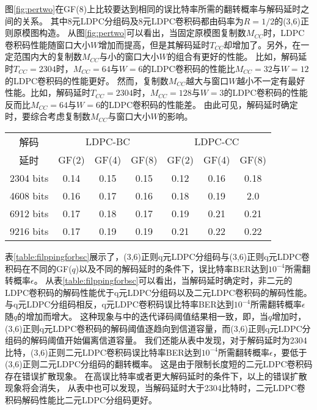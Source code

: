 图\ref{fig:pertwo}在GF($8$)上比较要达到相同的误比特率所需的翻转概率与解码延时之间的关系。
其中8元LDPC分组码及8元LDPC卷积码都由码率为$R=1/2$的(3,6)正则原模图构造。
从图\ref{fig:pertwo}可以看出，当固定原模图复制数$M_{CC}$时，LDPC卷积码性能随窗口大小$W$增加而提高，但是其解码延时$T_{CC}$却增加了。另外，在一定范围内大的复制数$M_{CC}$与小的窗口大小$W$的组合有更好的性能。
比如，解码延时$T_{CC}=2304$时，$M_{CC}=64$与$W=6$的LDPC卷积码的性能比$M_{CC}=32$与$W=12$的LDPC卷积码的性能更好。
然而，复制数$M_{CC}$越大与窗口$W$越小不一定有最好性能。比如，解码延时$T_{CC}=2304$时，$M_{CC}=128$与$W=3$的LDPC卷积码的性能反而比$M_{CC}=64$与$W=6$的LDPC卷积码的性能差。
由此可见，解码延时确定时，要综合考虑复制数$M_{CC}$与窗口大小$W$的影响。
\begin{center}
\label{table:filppingforbsc}
\begin{tabular}{|c|c|c|c|c|c|c|}
 \hline
解码 & \multicolumn{3}{|c|}{LDPC-BC} & \multicolumn{3}{|c|}{LDPC-CC} \\ \cline{2-7}
延时 & GF(2) & GF(4) & GF(8) & GF(2) & GF(4) & GF(8) \\ \hline
2304 bits & 0.14 & 0.15 & 0.15 & 0.12 & 0.16 & 0.18\\ \hline
4608 bits & 0.16 & 0.17 & 0.16 & 0.18 & 0.19 & 2.0\\ \hline
6912 bits & 0.17 & 0.18 & 0.17 & 0.19 & 0.21 & 0.21\\ \hline
9216 bits & 0.17 & 0.19 & 0.19 & 0.21 & 0.22 & 0.22\\ \hline
\end{tabular}
\end{center}

表\ref{table:filppingforbsc}展示了，(3,6)正则q元LDPC分组码与(3,6)正则q元LDPC卷积码在不同的GF($q$)以及不同的解码延时的条件下，误比特率BER达到$10^{-4}$所需翻转概率$\epsilon$。
从表\ref{table:filppingforbsc}可以看出，当解码延时确定时，非二元的LDPC卷积码的解码性能优于q元LDPC分组码以及二元LDPC卷积码的解码性能。
与q元LDPC分组码相反，q元LDPC卷积码误比特率BER达到$10^{-4}$所需翻转概率$\epsilon$随$q$的增加而增大。
这种现象与\parencite{6874959}中的迭代译码阈值结果相一致，即，当$q$增加时，(3,6)正则q元LDPC卷积码的解码阈值逐趋向到信道容量，而(3,6)正则q元LDPC分组码的解码阈值开始偏离信道容量。
我们还能从表中发现，对于解码延时为2304比特，(3,6)正则二元LDPC卷积码误比特率BER达到$10^{-4}$所需翻转概率$\epsilon$，要低于(3,6)正则二元LDPC分组码的翻转概率。
这是由于限制长度短的二元LDPC卷积码存在错误扩散现象。
在高误比特率或者更大解码延时的条件下，以上的错误扩散现象将会消失，
从表中也可以发现，当解码延时大于2304比特时，二元LDPC卷积码解码性能比二元LDPC分组码更好。



